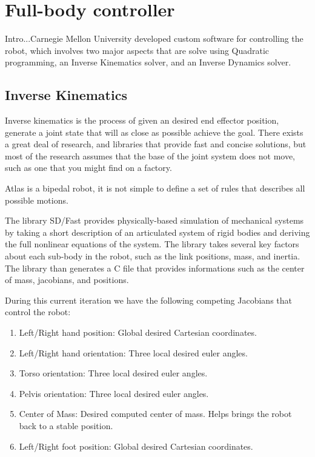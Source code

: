 \documentclass{article}
\begin{document}
\section{Full-body controller}
Intro...Carnegie Mellon University developed custom software for controlling the robot, which involves two major aspects that are solve using Quadratic programming, an Inverse Kinematics solver, and an Inverse Dynamics solver. 

\subsection{Inverse Kinematics}
Inverse kinematics is the process of given an desired end effector position, generate a joint state that will as close as possible achieve the goal. There exists a great deal of research, and libraries that provide fast and concise solutions, but most of the research assumes that the base of the joint system does not move, such as one that you might find on a factory. 

Atlas is a bipedal robot, it is not simple to define a set of rules that describes all possible motions. 

The library SD/Fast provides physically-based simulation of mechanical systems by taking a short description of an articulated system of rigid bodies and deriving the full nonlinear equations of the system. \cite{sdfast} The library takes several key factors about each sub-body in the robot, such as the link positions, mass, and inertia. The library than generates a C file that provides informations such as the center of mass, jacobians, and positions. 

During this current iteration we have the following competing Jacobians that control the robot: 
\begin{enumerate}
\item Left/Right hand position: Global desired Cartesian coordinates.
\item Left/Right hand orientation: Three local desired euler angles.
\item Torso orientation: Three local desired euler angles.
\item Pelvis orientation: Three local desired euler angles.
\item Center of Mass: Desired computed center of mass. Helps brings the robot back to a stable position.
\item Left/Right foot position: Global desired Cartesian coordinates.
\end{enumerate}
\end{document}
